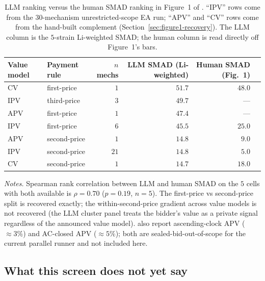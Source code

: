 \documentclass[12pt]{article}
\begin{document}
\begin{table}[t]
\centering
\caption{LLM ranking versus the human SMAD ranking in
Figure~1 of \citet{zhuLLMAuction2024}. ``IPV'' rows come from the
$30$-mechanism unrestricted-scope EA run; ``APV'' and ``CV''
rows come from the hand-built complement
(Section~\ref{sec:figure1-recovery}). The LLM column is the
$5$-strain Li-weighted SMAD; the human column is read directly off
Figure~1's bars.}
\label{tab:figure1-recovery}
\footnotesize
\setlength{\tabcolsep}{6pt}
\begin{tabular}{@{}llrrrr@{}}
\toprule
Value model & Payment rule & $n$ mechs & LLM SMAD (Li-weighted) & Human SMAD (Fig.~1) \\
\midrule
CV  & first-price  & $1$  & $\mathbf{51.7}$ & $48.0$ \\
IPV & third-price  & $3$  & $49.7$ & --- \\
APV & first-price  & $1$  & $47.4$ & --- \\
IPV & first-price  & $6$  & $45.5$ & $25.0$ \\
APV & second-price & $1$  & $14.8$ & $9.0$ \\
IPV & second-price & $21$ & $14.8$ & $5.0$ \\
CV  & second-price & $1$  & $14.7$ & $18.0$ \\
\bottomrule
\end{tabular}

\vspace{0.4em}
\begin{minipage}{0.95\textwidth}
\footnotesize\textit{Notes.} Spearman rank correlation
between LLM and human SMAD on the $5$ cells with both available is
$\rho = 0.70$ ($p = 0.19$, $n=5$). The first-price vs second-price
split is recovered exactly; the within-second-price gradient
across value models is not recovered (the LLM cluster panel treats
the bidder's value as a private signal regardless of the announced
value model). \citet{zhuLLMAuction2024} also report ascending-clock
APV ($\approx 3\%$) and AC-closed APV ($\approx 5\%$); both are
sealed-bid-out-of-scope for the current parallel runner and not
included here.\par
\end{minipage}
\end{table}

\subsection{What this screen does not yet say}
\label{sec:screen-limits}
\end{document}
